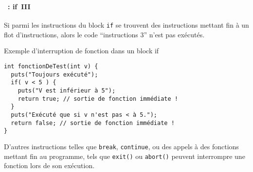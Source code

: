 \begin{frame}[containsverbatim]
  \frametitle{\secname}
  \framesubtitle{\subsecname~: if~III}

  Si parmi les instructions du block \verb|if| se trouvent des instructions mettant fin à un flot d'instructions, alors le code ``instructions 3'' n'est
  pas exécutés.
  {\small\begin{exampleblock}{Exemple d'interruption de fonction dans un block if}
    \begin{verbatim}
int fonctionDeTest(int v) {
  puts("Toujours exécuté");
  if( v < 5 ) {
    puts("V est inférieur à 5");
    return true; // sortie de fonction immédiate !
  }
  puts("Exécuté que si v n'est pas < à 5.");
  return false; // sortie de fonction immédiate !
}\end{verbatim}
  \end{exampleblock}}
  \vspace{0.3cm}
  \par
  D'autres instructions telles que \verb|break|, \verb|continue|, ou des appels à des fonctions mettant fin au programme, tels que \verb|exit()| ou \verb|abort()|
  peuvent interrompre une fonction lors de son exécution.
\end{frame}

